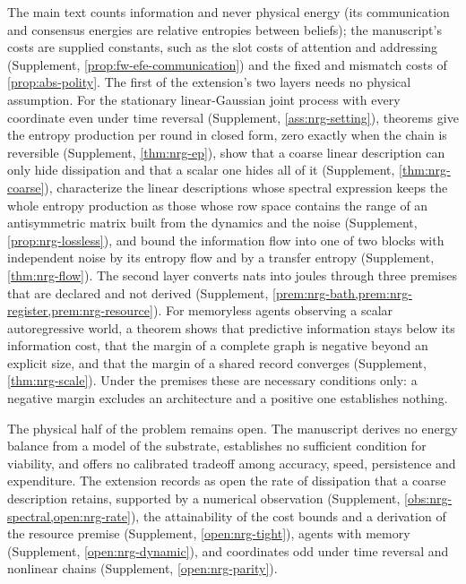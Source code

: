The main text counts information and never physical energy (its communication and consensus energies are relative entropies between beliefs); the manuscript's costs are supplied constants, such as the slot costs of attention and addressing (Supplement, \cref{prop:fw-efe-communication}) and the fixed and mismatch costs of \cref{prop:abs-polity}. The first of the extension's two layers needs no physical assumption. For the stationary linear-Gaussian joint process with every coordinate even under time reversal (Supplement, \cref{ass:nrg-setting}), theorems give the entropy production per round in closed form, zero exactly when the chain is reversible (Supplement, \cref{thm:nrg-ep}), show that a coarse linear description can only hide dissipation and that a scalar one hides all of it (Supplement, \cref{thm:nrg-coarse}), characterize the linear descriptions whose spectral expression keeps the whole entropy production as those whose row space contains the range of an antisymmetric matrix built from the dynamics and the noise (Supplement, \cref{prop:nrg-lossless}), and bound the information flow into one of two blocks with independent noise by its entropy flow and by a transfer entropy (Supplement, \cref{thm:nrg-flow}). The second layer converts nats into joules through three premises that are declared and not derived (Supplement, \cref{prem:nrg-bath,prem:nrg-register,prem:nrg-resource}). For memoryless agents observing a scalar autoregressive world, a theorem shows that predictive information stays below its information cost, that the margin of a complete graph is negative beyond an explicit size, and that the margin of a shared record converges (Supplement, \cref{thm:nrg-scale}). Under the premises these are necessary conditions only: a negative margin excludes an architecture and a positive one establishes nothing.

The physical half of the problem remains open. The manuscript derives no energy balance from a model of the substrate, establishes no sufficient condition for viability, and offers no calibrated tradeoff among accuracy, speed, persistence and expenditure. The extension records as open the rate of dissipation that a coarse description retains, supported by a numerical observation (Supplement, \cref{obs:nrg-spectral,open:nrg-rate}), the attainability of the cost bounds and a derivation of the resource premise (Supplement, \cref{open:nrg-tight}), agents with memory (Supplement, \cref{open:nrg-dynamic}), and coordinates odd under time reversal and nonlinear chains (Supplement, \cref{open:nrg-parity}).

